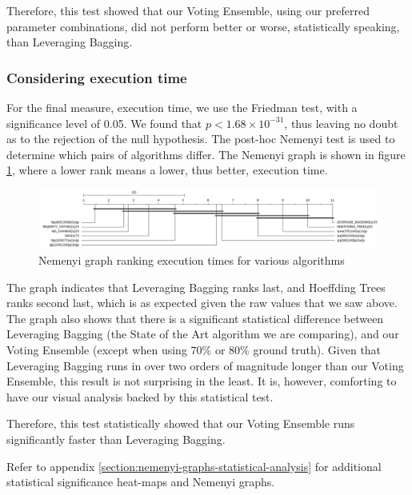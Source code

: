 Therefore, this test showed that our Voting Ensemble, using our preferred parameter combinations, did not perform better or worse, statistically speaking, than Leveraging Bagging.

\subsubsection{Considering execution time}

For the final measure, execution time, we use the Friedman test, with a significance level of 0.05. We found that $p < 1.68\times10^{-31}$, thus leaving no doubt as to the rejection of the null hypothesis. The post-hoc Nemenyi test is used to determine which pairs of algorithms differ. The Nemenyi graph is shown in figure  \ref{fig:sota_compare_all_execution_time_nemenyi}, where a lower rank means a lower, thus better, execution time.

\begin{figure}
  \includegraphics[width=\linewidth]{./images/chapter5/sota_compare_all_execution_time_nemenyi}
\caption{\label{fig:sota_compare_all_execution_time_nemenyi}Nemenyi graph ranking execution times for various algorithms}
\end{figure}

The graph indicates that Leveraging Bagging ranks last, and Hoeffding Trees ranks second last, which is as expected given the raw values that we saw above. 
The graph also shows that there is a significant statistical difference between Leveraging Bagging (the State of the Art algorithm we are comparing), and our Voting Ensemble (except when using $70\%$ or $80\%$ ground truth). Given that Leveraging Bagging runs in over two orders of magnitude longer than our Voting Ensemble, this result is not surprising in the least. It is, however, comforting to have our visual analysis backed by this statistical test.

Therefore, this test statistically showed that our Voting Ensemble runs significantly faster than Leveraging Bagging.

Refer to appendix \ref{section:nemenyi-graphs-statistical-analysis} for additional statistical significance heat-maps and Nemenyi graphs.

